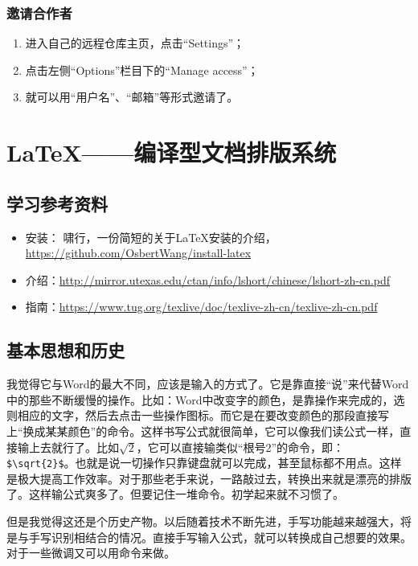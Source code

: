 \subsection{邀请合作者}
\begin{enumerate}
\item 进入自己的远程仓库主页，点击“Settings”；
\item 点击左侧“Options”栏目下的“Manage access”；
\item 就可以用“用户名”、“邮箱”等形式邀请了。
\end{enumerate}




\chapter{\LaTeX{}——编译型文档排版系统}
\section{学习参考资料}
\begin{itemize}
\item 安装： 啸行，一份简短的关于\LaTeX{}安装的介绍，\url{https://github.com/OsbertWang/install-latex}
\item 介绍：\url{http://mirror.utexas.edu/ctan/info/lshort/chinese/lshort-zh-cn.pdf}
\item 指南：\url{https://www.tug.org/texlive/doc/texlive-zh-cn/texlive-zh-cn.pdf}
\end{itemize}


\section{基本思想和历史}
我觉得它与Word的最大不同，应该是输入的方式了。它是靠直接“说”来代替Word中的那些不断缓慢的操作。比如：Word中改变字的颜色，是靠操作来完成的，选则相应的文字，然后去点击一些操作图标。而它是在要改变颜色的那段直接写上“换成某某颜色”的命令。这样书写公式就很简单，它可以像我们读公式一样，直接输上去就行了。比如$\sqrt{2}$，它可以直接输类似“根号2”的命令，即：\verb|$\sqrt{2}$|。也就是说一切操作只靠键盘就可以完成，甚至鼠标都不用点。这样是极大提高工作效率。对于那些老手来说，一路敲过去，转换出来就是漂亮的排版了。这样输公式爽多了。但要记住一堆命令。初学起来就不习惯了。

但是我觉得这还是个历史产物。以后随着技术不断先进，手写功能越来越强大，将是与手写识别相结合的情况。直接手写输入公式，就可以转换成自己想要的效果。对于一些微调又可以用命令来做。




